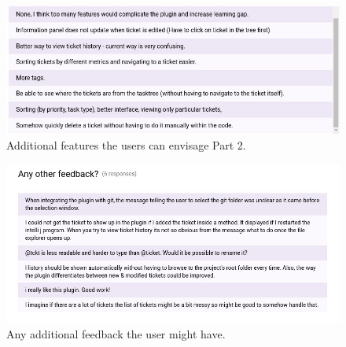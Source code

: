 \documentclass{4thYearProject}
\begin{document}
\begin{appendices}
\begin{figure}
\includegraphics[scale=0.5]{Other_function2}
\centering
\caption{Additional features the users can envisage Part 2.}
\label{fig:func1}
\end{figure}


\begin{figure}
\includegraphics[scale=0.5]{Any_other_feedback}
\centering
\caption{Any additional feedback the user might have.}
\label{fig:anyother}
\end{figure}
\end{appendices}
\end{document}
